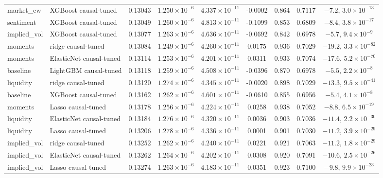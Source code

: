 \begin{table}[t]
\begin{tabular}{@{}llccccccc@{}}
market\_ew & XGBoost causal-tuned & 0.13043 & $1.250 \times 10^{-6}$ & $4.337 \times 10^{-11}$ & -0.0002 & 0.864 & 0.7117 & $-7.2$, $3.0 \times 10^{-13}$ \\
sentiment & XGBoost causal-tuned & 0.13049 & $1.260 \times 10^{-6}$ & $4.813 \times 10^{-11}$ & -0.1099 & 0.853 & 0.6809 & $-8.4$, $3.8 \times 10^{-17}$ \\
implied\_vol & XGBoost causal-tuned & 0.13077 & $1.263 \times 10^{-6}$ & $4.636 \times 10^{-11}$ & -0.0692 & 0.842 & 0.6978 & $-5.7$, $9.4 \times 10^{-9}$ \\
moments & ridge causal-tuned & 0.13084 & $1.249 \times 10^{-6}$ & $4.260 \times 10^{-11}$ & 0.0175 & 0.936 & 0.7029 & $-19.2$, $3.3 \times 10^{-82}$ \\
moments & ElasticNet causal-tuned & 0.13114 & $1.253 \times 10^{-6}$ & $4.201 \times 10^{-11}$ & 0.0311 & 0.933 & 0.7074 & $-17.6$, $5.2 \times 10^{-70}$ \\
baseline & LightGBM causal-tuned & 0.13118 & $1.259 \times 10^{-6}$ & $4.508 \times 10^{-11}$ & -0.0396 & 0.870 & 0.6978 & $-5.5$, $2.2 \times 10^{-8}$ \\
liquidity & ridge causal-tuned & 0.13120 & $1.274 \times 10^{-6}$ & $4.345 \times 10^{-11}$ & -0.0020 & 0.898 & 0.7029 & $-13.3$, $9.5 \times 10^{-41}$ \\
baseline & XGBoost causal-tuned & 0.13162 & $1.262 \times 10^{-6}$ & $4.601 \times 10^{-11}$ & -0.0610 & 0.855 & 0.6956 & $-5.4$, $4.1 \times 10^{-8}$ \\
moments & Lasso causal-tuned & 0.13178 & $1.256 \times 10^{-6}$ & $4.224 \times 10^{-11}$ & 0.0258 & 0.938 & 0.7052 & $-8.8$, $6.5 \times 10^{-19}$ \\
liquidity & ElasticNet causal-tuned & 0.13184 & $1.276 \times 10^{-6}$ & $4.320 \times 10^{-11}$ & 0.0036 & 0.903 & 0.7036 & $-11.4$, $2.2 \times 10^{-30}$ \\
liquidity & Lasso causal-tuned & 0.13206 & $1.278 \times 10^{-6}$ & $4.336 \times 10^{-11}$ & 0.0001 & 0.901 & 0.7030 & $-11.2$, $3.9 \times 10^{-29}$ \\
implied\_vol & ridge causal-tuned & 0.13252 & $1.262 \times 10^{-6}$ & $4.240 \times 10^{-11}$ & 0.0221 & 0.921 & 0.7063 & $-11.2$, $1.8 \times 10^{-29}$ \\
implied\_vol & ElasticNet causal-tuned & 0.13262 & $1.264 \times 10^{-6}$ & $4.202 \times 10^{-11}$ & 0.0308 & 0.920 & 0.7091 & $-10.6$, $2.5 \times 10^{-26}$ \\
implied\_vol & Lasso causal-tuned & 0.13274 & $1.263 \times 10^{-6}$ & $4.183 \times 10^{-11}$ & 0.0351 & 0.923 & 0.7100 & $-9.8$, $9.9 \times 10^{-23}$ \\

\end{tabular}
\end{table}
